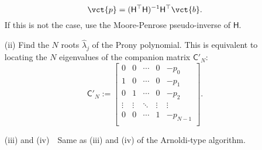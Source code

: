 \documentclass[a4paper,10pt]{article}
\begin{document}
\begin{enumerate}
\[
\vct{p}=(\mathsf{H}^\top\mathsf{H})^{-1}\mathsf{H}^\top\vct{b}.
\]
If this is not the case, use the Moore-Penrose pseudo-inverse of $\mathsf{H}$. 
%
\item[(ii)] Find the $N$ roots $\hat{\lambda}_j$ of the Prony polynomial.   
This is equivalent to locating the $N$ eigenvalues of the companion matrix $\mathsf{C}'_N$:
\[
\mathsf{C}'_N:=\left[
\begin{array}{ccccc}
0 & 0 & \cdots & 0 & -p_0\\
1 & 0 & \cdots & 0 & -p_1\\
0 & 1 & \cdots & 0 & -p_2\\
\vdots & \vdots & \ddots & \vdots & \vdots\\
0 & 0 & \cdots & 1 & -p_{N-1}\\
\end{array}
\right].
\]
%
\item[(iii)] and (iv)~~Same as (iii) and (iv) of the Arnoldi-type algorithm.
\end{enumerate}
\end{document}
